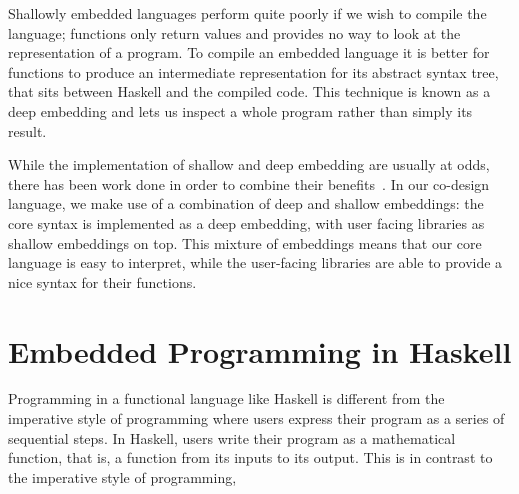 \documentclass[../main.tex]{subfiles}
\begin{document}
Shallowly embedded languages perform quite poorly if we wish to compile the language; functions only return values and provides no way to look at the representation of a program. To compile an embedded language it is better for functions to produce an intermediate representation for its abstract syntax tree, that sits between Haskell and the compiled code. This technique is known as a deep embedding and lets us inspect a whole program rather than simply its result.


While the implementation of shallow and deep embedding are usually at odds, there has been work done in order to combine their benefits~\cite{svenningsson2012}. In our co-design language, we make use of a combination of deep and shallow embeddings: the core syntax is implemented as a deep embedding, with user facing libraries as shallow embeddings on top. This mixture of embeddings means that our core language is easy to interpret, while the user-facing libraries are able to provide a nice syntax for their functions.


\section{Embedded Programming in Haskell}
\label{haskell}

Programming in a functional language like Haskell is different from the imperative style of programming where users express their program as a series of sequential steps. In Haskell, users write their program as a mathematical function, that is, a function from its inputs to its output. This is in contrast to the imperative style of programming, 


\end{document}
